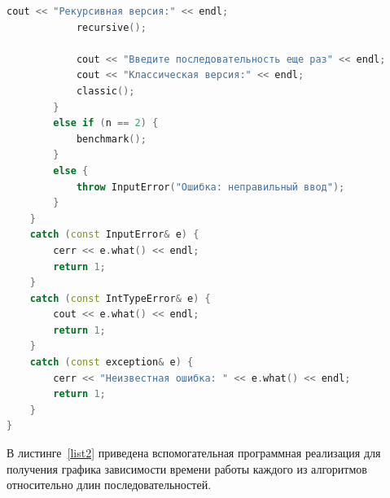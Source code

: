 \documentclass[14pt]{article}
\begin{document}
\begin{flushleft}
\begin{lstlisting}[label = list1, caption = Программная реализация, language=C++, xleftmargin=0pt, xrightmargin=0pt]
			cout << "Рекурсивная версия:" << endl;
			recursive();
			
			cout << "Введите последовательность еще раз" << endl;
			cout << "Классическая версия:" << endl;
			classic();
		}
		else if (n == 2) {
			benchmark();
		}
		else {
			throw InputError("Ошибка: неправильный ввод");
		}
	}
	catch (const InputError& e) {
		cerr << e.what() << endl;
		return 1;
	}
	catch (const IntTypeError& e) {
		cout << e.what() << endl;
		return 1;
	}
	catch (const exception& e) {
		cerr << "Неизвестная ошибка: " << e.what() << endl;
		return 1;
	}
}
		\end{lstlisting}
	\end{flushleft}
		В листинге~\ref{list2} приведена вспомогательная программная реализация для получения графика зависимости времени работы каждого из алгоритмов относительно длин последовательностей.
\end{document}
